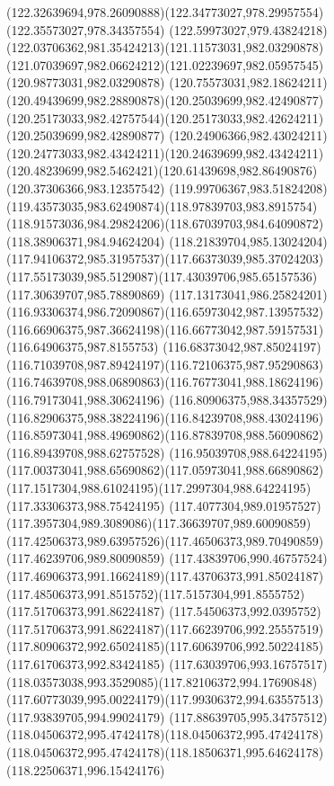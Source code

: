 {{	\curveto(122.32639694,978.26090888)(122.34773027,978.29957554)(122.35573027,978.34357554)
	\curveto(122.59973027,979.43824218)(122.03706362,981.35424213)(121.11573031,982.03290878)
	\curveto(121.07039697,982.06624212)(121.02239697,982.05957545)(120.98773031,982.03290878)
	\curveto(120.75573031,982.18624211)(120.49439699,982.28890878)(120.25039699,982.42490877)
	\curveto(120.25173033,982.42757544)(120.25173033,982.42624211)(120.25039699,982.42890877)
	\curveto(120.24906366,982.43024211)(120.24773033,982.43424211)(120.24639699,982.43424211)
	\curveto(120.48239699,982.5462421)(120.61439698,982.86490876)(120.37306366,983.12357542)
	\curveto(119.99706367,983.51824208)(119.43573035,983.62490874)(118.97839703,983.8915754)
	\curveto(118.91573036,984.29824206)(118.67039703,984.64090872)(118.38906371,984.94624204)
	\curveto(118.21839704,985.13024204)(117.94106372,985.31957537)(117.66373039,985.37024203)
	\curveto(117.55173039,985.5129087)(117.43039706,985.65157536)(117.30639707,985.78890869)
	\curveto(117.13173041,986.25824201)(116.93306374,986.72090867)(116.65973042,987.13957532)
	\curveto(116.66906375,987.36624198)(116.66773042,987.59157531)(116.64906375,987.8155753)
	\curveto(116.68373042,987.85024197)(116.71039708,987.89424197)(116.72106375,987.95290863)
	\curveto(116.74639708,988.06890863)(116.76773041,988.18624196)(116.79173041,988.30624196)
	\curveto(116.80906375,988.34357529)(116.82906375,988.38224196)(116.84239708,988.43024196)
	\curveto(116.85973041,988.49690862)(116.87839708,988.56090862)(116.89439708,988.62757528)
	\curveto(116.95039708,988.64224195)(117.00373041,988.65690862)(117.05973041,988.66890862)
	\curveto(117.1517304,988.61024195)(117.2997304,988.64224195)(117.33306373,988.75424195)
	\curveto(117.4077304,989.01957527)(117.3957304,989.3089086)(117.36639707,989.60090859)
	\curveto(117.42506373,989.63957526)(117.46506373,989.70490859)(117.46239706,989.80090859)
	\curveto(117.43839706,990.46757524)(117.46906373,991.16624189)(117.43706373,991.85024187)
	\curveto(117.48506373,991.8515752)(117.5157304,991.8555752)(117.51706373,991.86224187)
	\curveto(117.54506373,992.0395752)(117.51706373,991.86224187)(117.66239706,992.25557519)
	\curveto(117.80906372,992.65024185)(117.60639706,992.50224185)(117.61706373,992.83424185)
	\curveto(117.63039706,993.16757517)(118.03573038,993.3529085)(117.82106372,994.17690848)
	\curveto(117.60773039,995.00224179)(117.99306372,994.63557513)(117.93839705,994.99024179)
	\curveto(117.88639705,995.34757512)(118.04506372,995.47424178)(118.04506372,995.47424178)
	\curveto(118.04506372,995.47424178)(118.18506371,995.64624178)(118.22506371,996.15424176)
}}
